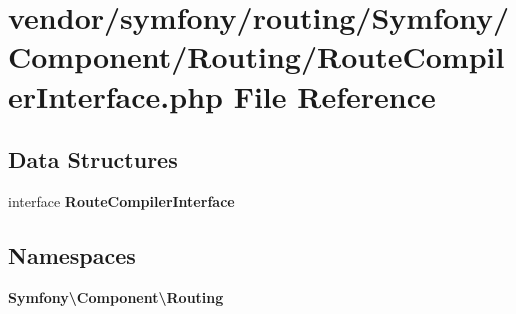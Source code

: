 \section{vendor/symfony/routing/\+Symfony/\+Component/\+Routing/\+Route\+Compiler\+Interface.php File Reference}
\label{_route_compiler_interface_8php}
\subsection*{Data Structures}
\begin{DoxyCompactItemize}
\item 
interface {\bf Route\+Compiler\+Interface}
\end{DoxyCompactItemize}
\subsection*{Namespaces}
\begin{DoxyCompactItemize}
\item 
 {\bf Symfony\textbackslash{}\+Component\textbackslash{}\+Routing}
\end{DoxyCompactItemize}
